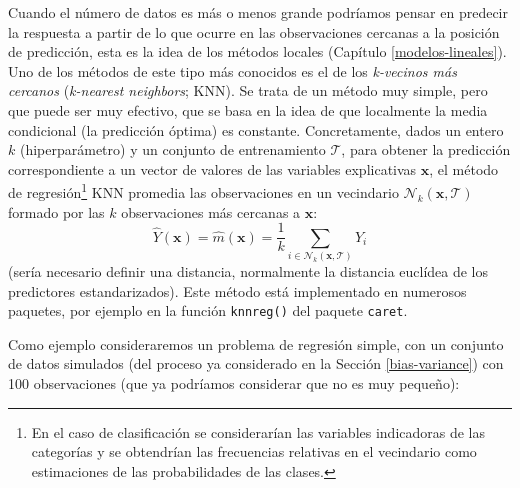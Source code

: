 \documentclass[
]{book}
\theoremstyle{break}
\theoremstyle{nonumberplain}
\begin{document}
Cuando el número de datos es más o menos grande podríamos pensar en predecir la respuesta a partir de lo que ocurre en las observaciones cercanas a la posición de predicción, esta es la idea de los métodos locales (Capítulo \ref{modelos-lineales}).
Uno de los métodos de este tipo más conocidos es el de los \emph{k-vecinos más cercanos} (\emph{k-nearest neighbors}; KNN).
Se trata de un método muy simple, pero que puede ser muy efectivo, que se basa en la idea de que localmente la media condicional (la predicción óptima) es constante.
Concretamente, dados un entero \(k\) (hiperparámetro) y un conjunto de entrenamiento \(\mathcal{T}\), para obtener la predicción correspondiente a un vector de valores de las variables explicativas \(\mathbf{x}\), el método de regresión\footnote{En el caso de clasificación se considerarían las variables indicadoras de las categorías y se obtendrían las frecuencias relativas en el vecindario como estimaciones de las probabilidades de las clases.} KNN promedia las observaciones en un vecindario \(\mathcal{N}_k(\mathbf{x}, \mathcal{T})\) formado por las \(k\) observaciones más cercanas a \(\mathbf{x}\): \[\hat{Y}(\mathbf{x}) = \hat{m}(\mathbf{x}) = \frac{1}{k} \sum_{i \in \mathcal{N}_k(\mathbf{x}, \mathcal{T})} Y_i\] (sería necesario definir una distancia, normalmente la distancia euclídea de los predictores estandarizados).
Este método está implementado en numerosos paquetes, por ejemplo en la función \texttt{knnreg()} del paquete \texttt{caret}.

Como ejemplo consideraremos un problema de regresión simple, con un conjunto de datos simulados (del proceso ya considerado en la Sección \ref{bias-variance}) con 100 observaciones (que ya podríamos considerar que no es muy pequeño):
\end{document}
